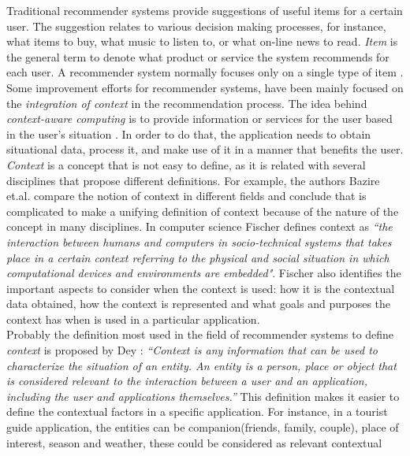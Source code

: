 Traditional recommender systems provide suggestions of useful items
for a certain user. The suggestion relates to various decision making
processes, for instance, what items to buy, what music to listen to, or
what on-line news to read. \textit{Item} is the general term to denote
what product or service the system recommends for each user. A
recommender system normally focuses only on a single type of item
 \cite{resnick1997recommender}.
Some improvement efforts for recommender systems, have been mainly
focused on the
\textit{integration of context} in the recommendation process. 
The idea behind \textit{context-aware computing} is to provide
information or services for the user based in the user's situation
 \cite{dey2001understanding}. In order to do that, the application 
needs to obtain situational data, process it, and make use of it 
in a manner that benefits the user. \\ 
\textit{Context} is a concept that is not easy to define, as it is related with
several disciplines that propose different definitions. For example,
the authors Bazire et.al. \cite{bazire2005understanding} compare the
notion of context in different fields and conclude that is complicated to make a
unifying definition of context because of the nature of the concept in
many disciplines. In computer science Fischer \cite{fischer2012context}
defines context as \textit{``the interaction between humans and
computers in socio-technical systems that takes place in a certain
context referring to the physical and social situation in which
computational devices and environments are embedded"}. 
Fischer also identifies
the important aspects to consider when the context is used: how it is
the contextual data obtained, how the context is represented and what
goals and purposes the context has when is used in a particular
application. \\
Probably the definition most used in the field of recommender systems to 
define \textit{context} is proposed by Dey \cite{dey2001understanding}:
\textit{``Context is any information that can be used to characterize
the situation of an entity. An entity is a person, place or object
that is considered relevant to the interaction between a user and an
application, including the user and applications themselves.''}  This
definition makes it easier to define the contextual factors in a
specific application. For instance, in a tourist guide application, the
entities can be companion(friends, family, couple), place of interest,
season and weather, these could be considered as relevant contextual
